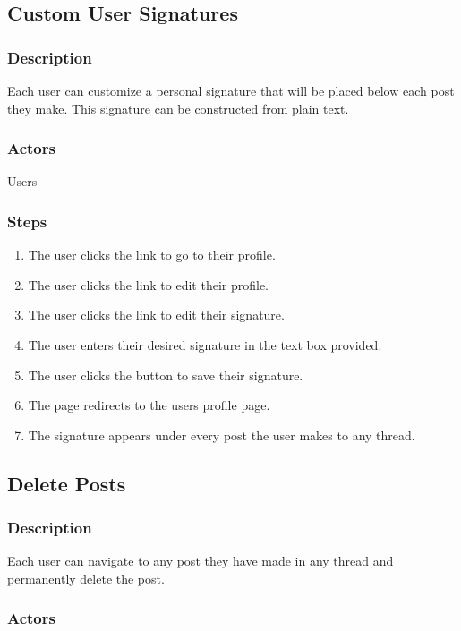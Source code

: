 \documentclass[12pt]{scrartcl}
\begin{document}
\subsection{Custom User Signatures}
\subsubsection{Description}

Each user can customize a personal signature that will be placed below each post they make. This signature can be constructed from plain text.

\subsubsection{Actors}

Users

\subsubsection{Steps}

\begin{enumerate}
\item The user clicks the link to go to their profile.
\item The user clicks the link to edit their profile.
\item The user clicks the link to edit their signature.
\item The user enters their desired signature in the text box provided.
\item The user clicks the button to save their signature.
\item The page redirects to the users profile page.
\item The signature appears under every post the user makes to any thread.
\end{enumerate}

\subsection{Delete Posts}
\subsubsection{Description}

Each user can navigate to any post they have made in any thread and permanently delete the post.

\subsubsection{Actors}
\end{document}
